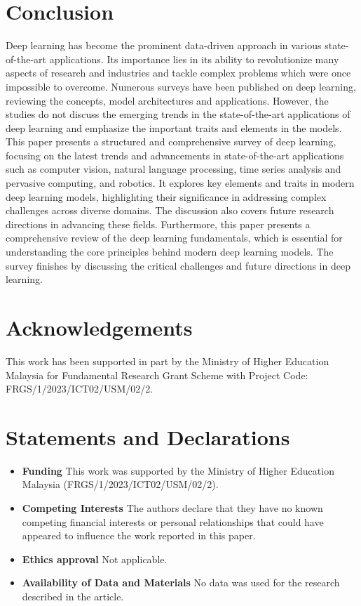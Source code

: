 \documentclass[preprint,12pt]{elsarticle}
\begin{document}
\section{Conclusion}\label{sec7}
Deep learning has become the prominent data-driven approach in various state-of-the-art applications. Its importance lies in its ability to revolutionize many aspects of research and industries and tackle complex problems which were once impossible to overcome. Numerous surveys have been published on deep learning, reviewing the concepts, model architectures and applications. However, the studies do not discuss the emerging trends in the state-of-the-art applications of deep learning and emphasize the important traits and elements in the models. This paper presents a structured and comprehensive survey of deep learning, focusing on the latest trends and advancements in state-of-the-art applications such as computer vision, natural language processing, time series analysis and pervasive computing, and robotics. It explores key elements and traits in modern deep learning models, highlighting their significance in addressing complex challenges across diverse domains. The discussion also covers future research directions in advancing these fields. Furthermore, this paper presents a comprehensive review of the deep learning fundamentals, which is essential for understanding the core principles behind modern deep learning models. The survey finishes by discussing the critical challenges and future directions in deep learning.

\section*{Acknowledgements}
This work has been supported in part by the Ministry of Higher Education Malaysia for Fundamental Research Grant Scheme with Project Code: FRGS/1/2023/ICT02/USM/02/2.


\section*{Statements and Declarations}
\begin{itemize}
\item \textbf{Funding} This work was supported by the Ministry of Higher Education Malaysia (FRGS/1/2023/ICT02/USM/02/2).
\item \textbf{Competing Interests} The authors declare that they have no known competing financial interests or personal relationships that could have appeared to influence the work reported in this paper.
\item \textbf{Ethics approval} Not applicable.
\item \textbf{Availability of Data and Materials} No data was used for the research described in the article.
\end{itemize}
\end{document}
